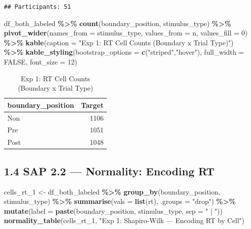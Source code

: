 \documentclass[
]{article}
\newenvironment{Shaded}{\begin{snugshade}}{\end{snugshade}}
\newcommand{\AttributeTok}[1]{\textcolor[rgb]{0.13,0.29,0.53}{#1}}
\newcommand{\ConstantTok}[1]{\textcolor[rgb]{0.56,0.35,0.01}{#1}}
\newcommand{\DecValTok}[1]{\textcolor[rgb]{0.00,0.00,0.81}{#1}}
\newcommand{\FunctionTok}[1]{\textcolor[rgb]{0.13,0.29,0.53}{\textbf{#1}}}
\newcommand{\NormalTok}[1]{#1}
\newcommand{\OtherTok}[1]{\textcolor[rgb]{0.56,0.35,0.01}{#1}}
\newcommand{\SpecialCharTok}[1]{\textcolor[rgb]{0.81,0.36,0.00}{\textbf{#1}}}
\newcommand{\StringTok}[1]{\textcolor[rgb]{0.31,0.60,0.02}{#1}}
\begin{document}
\begin{verbatim}
## Participants: 51
\end{verbatim}

\begin{Shaded}
\begin{Highlighting}[]
\NormalTok{df\_both\_labeled }\SpecialCharTok{\%\textgreater{}\%}
  \FunctionTok{count}\NormalTok{(boundary\_position, stimulus\_type) }\SpecialCharTok{\%\textgreater{}\%}
  \FunctionTok{pivot\_wider}\NormalTok{(}\AttributeTok{names\_from =}\NormalTok{ stimulus\_type, }\AttributeTok{values\_from =}\NormalTok{ n, }\AttributeTok{values\_fill =} \DecValTok{0}\NormalTok{) }\SpecialCharTok{\%\textgreater{}\%}
  \FunctionTok{kable}\NormalTok{(}\AttributeTok{caption =} \StringTok{"Exp 1: RT Cell Counts (Boundary x Trial Type)"}\NormalTok{) }\SpecialCharTok{\%\textgreater{}\%}
  \FunctionTok{kable\_styling}\NormalTok{(}\AttributeTok{bootstrap\_options =} \FunctionTok{c}\NormalTok{(}\StringTok{"striped"}\NormalTok{,}\StringTok{"hover"}\NormalTok{), }\AttributeTok{full\_width =} \ConstantTok{FALSE}\NormalTok{, }\AttributeTok{font\_size =} \DecValTok{12}\NormalTok{)}
\end{Highlighting}
\end{Shaded}

\begingroup\fontsize{12}{14}\selectfont

\begin{longtable}[t]{lr}
\caption{\label{tab:exp1_cell_count}Exp 1: RT Cell Counts (Boundary x Trial Type)}\\
\toprule
boundary\_position & Target\\
\midrule
Non & 1106\\
Pre & 1051\\
Post & 1048\\
\bottomrule
\end{longtable}
\endgroup{}

\subsection{1.4 SAP 2.2 --- Normality: Encoding
RT}\label{sap-2.2-normality-encoding-rt}

\begin{Shaded}
\begin{Highlighting}[]
\NormalTok{cells\_rt\_1 }\OtherTok{\textless{}{-}}\NormalTok{ df\_both\_labeled }\SpecialCharTok{\%\textgreater{}\%}
  \FunctionTok{group\_by}\NormalTok{(boundary\_position, stimulus\_type) }\SpecialCharTok{\%\textgreater{}\%}
  \FunctionTok{summarise}\NormalTok{(}\AttributeTok{vals =} \FunctionTok{list}\NormalTok{(rt), }\AttributeTok{.groups =} \StringTok{"drop"}\NormalTok{) }\SpecialCharTok{\%\textgreater{}\%}
  \FunctionTok{mutate}\NormalTok{(}\AttributeTok{label =} \FunctionTok{paste}\NormalTok{(boundary\_position, stimulus\_type, }\AttributeTok{sep =} \StringTok{" | "}\NormalTok{))}
\FunctionTok{normality\_table}\NormalTok{(cells\_rt\_1, }\StringTok{"Exp 1: Shapiro{-}Wilk — Encoding RT by Cell"}\NormalTok{)}
\end{Highlighting}
\end{Shaded}
\end{document}
